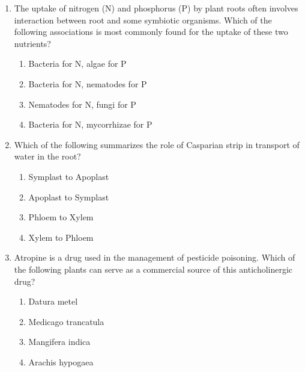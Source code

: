 \documentclass[journal,12pt,onecolumn]{IEEEtran}
\begin{document}
\begin{enumerate}[label=\arabic*.]
\begin{multicols}{4}
\begin{enumerate}[label=(\Alph*)]
\item Trichomes
\item Tracheids
\item Collenchyma
\item Mesophyll
\end{enumerate}
\end{multicols}

\item The uptake of nitrogen (N) and phosphorus (P) by plant roots often involves interaction between root and some symbiotic organisms. Which of the following associations is most commonly found for the uptake of these two nutrients?

\begin{multicols}{2}
\begin{enumerate}[label=(\Alph*)]
\item Bacteria for N, algae for P
\item Bacteria for N, nematodes for P
\item Nematodes for N, fungi for P
\item Bacteria for N, mycorrhizae for P
\end{enumerate}
\end{multicols}

\item Which of the following summarizes the role of Casparian strip in transport of water in the root?

\begin{multicols}{2}
\begin{enumerate}[label=(\Alph*)]
\item Symplast to Apoplast
\item Apoplast to Symplast
\item Phloem to Xylem
\item Xylem to Phloem
\end{enumerate}
\end{multicols}

\item Atropine is a drug used in the management of pesticide poisoning. Which of the following plants can serve as a commercial source of this anticholinergic drug?

\begin{multicols}{2}
\begin{enumerate}[label=(\Alph*)]
\item Datura metel
\item Medicago trancatula
\item Mangifera indica
\item Arachis hypogaea
\end{enumerate}
\end{multicols}


\end{enumerate}
\end{document}
